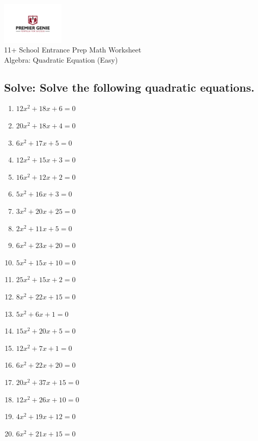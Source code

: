 \documentclass{article}
\begin{document}
\begin{center}
\includegraphics[width=3cm]{PREMGENIEJPG.jpg}\\
{\Large 11+ School Entrance Prep Math Worksheet}\\
{\Medium Algebra: Quadratic Equation (Easy)}\\

\end{center}

\subsection*{Solve: Solve the following quadratic equations.}

\begin{enumerate}
\item $\displaystyle 12 x^{2} + 18 x + 6 = 0 $ \ 
\item $\displaystyle 20 x^{2} + 18 x + 4 = 0 $ \ 
\item $\displaystyle 6 x^{2} + 17 x + 5 = 0 $ \ 
\item $\displaystyle 12 x^{2} + 15 x + 3 = 0 $ \ 
\item $\displaystyle 16 x^{2} + 12 x + 2 = 0 $ \ 
\item $\displaystyle 5 x^{2} + 16 x + 3 = 0 $ \ 
\item $\displaystyle 3 x^{2} + 20 x + 25 = 0 $ \ 
\item $\displaystyle 2 x^{2} + 11 x + 5 = 0 $ \ 
\item $\displaystyle 6 x^{2} + 23 x + 20 = 0 $ \ 
\item $\displaystyle 5 x^{2} + 15 x + 10 = 0 $ \ 
\item $\displaystyle 25 x^{2} + 15 x + 2 = 0 $ \ 
\item $\displaystyle 8 x^{2} + 22 x + 15 = 0 $ \ 
\item $\displaystyle 5 x^{2} + 6 x + 1 = 0 $ \ 
\item $\displaystyle 15 x^{2} + 20 x + 5 = 0 $ \ 
\item $\displaystyle 12 x^{2} + 7 x + 1 = 0 $ \ 
\item $\displaystyle 6 x^{2} + 22 x + 20 = 0 $ \ 
\item $\displaystyle 20 x^{2} + 37 x + 15 = 0 $ \ 
\item $\displaystyle 12 x^{2} + 26 x + 10 = 0 $ \ 
\item $\displaystyle 4 x^{2} + 19 x + 12 = 0 $ \ 
\item $\displaystyle 6 x^{2} + 21 x + 15 = 0 $ \ 


\end{enumerate}
\end{document}
